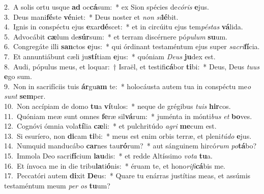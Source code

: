 {2.~}A solis ortu usque \textbf{ad} oc\textbf{cá}sum:~* ex Sion spécies de\textit{có}\textit{ris} \textbf{e}jus.\\
{3.~}Deus mani\textbf{fé}ste \textbf{vé}niet:~* Deus noster et \textit{non} \textit{si}\textbf{lé}bit.\\
{4.~}Ignis in conspéctu ejus \textbf{e}xar\textbf{dé}scet:~* et in circúitu ejus tem\textit{pé}\textit{stas} \textbf{vá}lida.\\
{5.~}Advocábit \textbf{cæ}lum de\textbf{súr}sum:~* et terram discérnere pó\textit{pu}\textit{lum} \textbf{su}um.\\
{6.~}Congregáte illi \textbf{san}ctos \textbf{e}jus:~* qui órdinant testaméntum ejus super \textit{sa}\textit{cri}\textbf{fí}cia.\\
{7.~}Et annuntiábunt cæli ju\textbf{stí}tiam \textbf{e}jus:~* quóniam \textit{De}\textit{us} \textbf{ju}dex est.\\
{8.~}Audi, pópulus meus, et loquar:~† Israël, et testifi\textbf{cá}bor \textbf{ti}bi:~* Deus, Deus \textit{tu}\textit{us} \textbf{e}go sum.\\
{9.~}Non in sacrifíciis tuis \textbf{ár}gu\textbf{am} te:~* holocáusta autem tua in conspéctu me\textit{o} \textit{sunt} \textbf{sem}per.\\
{10.~}Non accípiam de domo \textbf{tu}a \textbf{ví}tulos:~* neque de grégibus \textit{tu}\textit{is} \textbf{hir}cos.\\
{11.~}Quóniam meæ sunt omnes \textbf{fe}ræ sil\textbf{vá}rum:~* juménta in mónti\textit{bus} \textit{et} \textbf{bo}ves.\\
{12.~}Cognóvi ómnia vola\textbf{tí}lia \textbf{cæ}li:~* et pulchritúdo \textit{a}\textit{gri} \textbf{me}cum est.\\
{13.~}Si esuríero, non \textbf{di}cam \textbf{ti}bi:~* meus est enim orbis terræ, et pleni\textit{tú}\textit{do} \textbf{e}jus.\\
{14.~}Numquid manducábo \textbf{car}nes tau\textbf{ró}rum?~* aut sánguinem hircó\textit{rum} \textit{po}\textbf{tá}bo?\\
{15.~}Immola Deo sacri\textbf{fí}cium \textbf{lau}dis:~* et redde Altíssimo \textit{vo}\textit{ta} \textbf{tu}a.\\
{16.~}Et ínvoca me in die tribu\textbf{la}ti\textbf{ó}nis:~* éruam te, et hono\textit{ri}\textit{fi}\textbf{cá}bis me.\\
{17.~}Peccatóri autem \textbf{di}xit \textbf{De}us:~* Quare tu enárras justítias meas, et assúmis testaméntum meum \textit{per} \textit{os} \textbf{tu}um?\\
